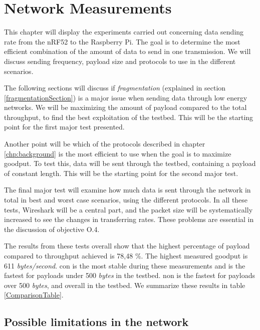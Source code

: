 \chapter{Network Measurements}
\label{chp:measurements2}


\noindent This chapter will display the experiments carried out concerning data sending rate from the \gls{nRF52} to the \gls{Raspberry Pi}. The goal is to determine the most efficient combination of the amount of data to send in one transmission. We will discuss sending frequency, \gls{payload} size and protocols to use in the different scenarios. 

\noindent The following sections will discuss if \textit{fragmentation} (explained in section \ref{fragmentationSection}) is a major issue when sending data through low energy networks. We will be maximizing the amount of \gls{payload} compared to the total throughput, to find the best exploitation of the testbed. This will be the starting point for the first major test presented. 

\noindent Another point will be which of the protocols described in chapter \ref{chp:background} is the most efficient to use when the goal is to maximize \gls{goodput}. To test this, data will be sent through the testbed, containing a payload of constant length. This will be the starting point for the second major test.

\noindent The final major test will examine how much data is sent through the network in total in best and worst case scenarios, using the different protocols. In all these tests, Wireshark will be a central part, and the packet size will be systematically increased to see the changes in transferring rates. These problems are essential in the discussion of objective O.4. 

\noindent The results from these tests overall show that the highest percentage of \gls{payload} compared to \gls{throughput} achieved is 78,48 \%. The highest measured \gls{goodput} is 611 \textit{bytes/second}. \gls{con} is the most stable during these measurements and is the fastest for \glspl{payload} under 500 \textit{bytes} in the testbed. \gls{non} is the fastest for \glspl{payload} over 500 \textit{bytes}, and overall in the testbed. We summarize these results in table \ref{ComparisonTable}. 


\section{Possible limitations in the network} 

